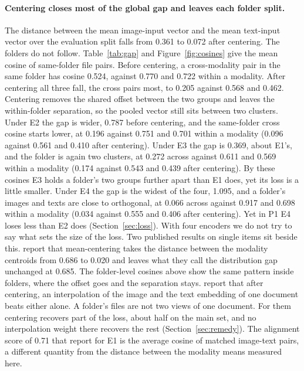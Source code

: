 \documentclass[11pt]{article}
\begin{document}
\paragraph{Centering closes most of the global gap and leaves each folder split.} The distance between the mean image-input vector and the mean text-input vector over the evaluation split falls from 0.361 to 0.072 after centering. The folders do not follow. Table~\ref{tab:gap} and Figure~\ref{fig:cosines} give the mean cosine of same-folder file pairs. Before centering, a cross-modality pair in the same folder has cosine 0.524, against 0.770 and 0.722 within a modality. After centering all three fall, the cross pairs most, to 0.205 against 0.568 and 0.462. Centering removes the shared offset between the two groups and leaves the within-folder separation, so the pooled vector still sits between two clusters. Under E2 the gap is wider, 0.787 before centering, and the same-folder cross cosine starts lower, at 0.196 against 0.751 and 0.701 within a modality (0.096 against 0.561 and 0.410 after centering). Under E3 the gap is 0.369, about E1's, and the folder is again two clusters, at 0.272 across against 0.611 and 0.569 within a modality (0.174 against 0.543 and 0.439 after centering). By these cosines E3 holds a folder's two groups further apart than E1 does, yet its loss is a little smaller. Under E4 the gap is the widest of the four, 1.095, and a folder's images and texts are close to orthogonal, at 0.066 across against 0.917 and 0.698 within a modality (0.034 against 0.555 and 0.406 after centering). Yet in P1 E4 loses less than E2 does (Section~\ref{sec:loss}). With four encoders we do not try to say what sets the size of the loss. Two published results on single items sit beside this. \citet{liu2026geometry} report that mean-centering takes the distance between the modality centroids from 0.686 to 0.020 and leaves what they call the distribution gap unchanged at 0.685. The folder-level cosines above show the same pattern inside folders, where the offset goes and the separation stays. \citet{li2025grclip} report that after centering, an interpolation of the image and the text embedding of one document beats either alone. A folder's files are not two views of one document. For them centering recovers part of the loss, about half on the main set, and no interpolation weight there recovers the rest (Section~\ref{sec:remedy}). The alignment score of 0.71 that \citet{gunther2025jinav4} report for E1 is the average cosine of matched image-text pairs, a different quantity from the distance between the modality means measured here.
\end{document}
